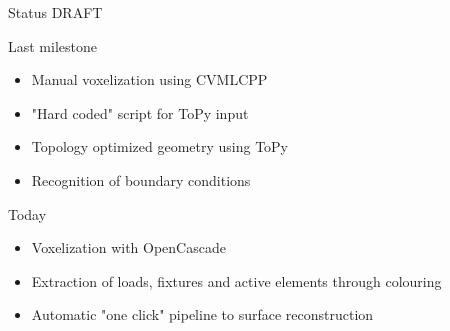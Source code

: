 \begin{frame}{Status DRAFT}
\begin{block}{Last milestone}
\begin{itemize}
	\item[\textcolor{green}{\Checkmark}] Manual voxelization using CVMLCPP
	\item[\textcolor{green}{\Checkmark}] "Hard coded" script for ToPy input
	\item[\textcolor{green}{\Checkmark}] Topology optimized geometry using ToPy
	\item[\textcolor{red}{\XSolidBrush}] Recognition of boundary conditions
\end{itemize}
\end{block}
\begin{block}{Today}
\begin{itemize}
	\item[\textcolor{green}{\Checkmark}] Voxelization with OpenCascade
	\item[\textcolor{green}{\Checkmark}] Extraction of loads, fixtures and active elements through colouring
	\item[\textcolor{green}{\Checkmark}] Automatic "one click" pipeline to surface reconstruction
\end{itemize}
\end{block}
\end{frame}

